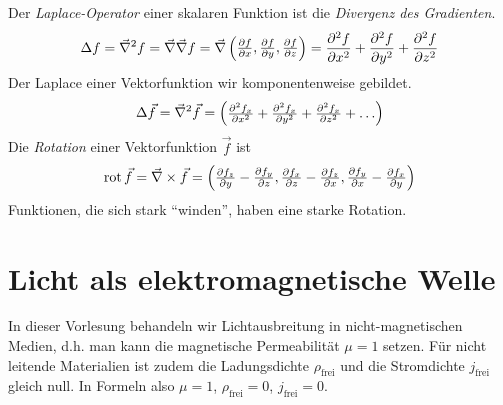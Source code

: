 Der \emph{Laplace-Operator}%
%
einer skalaren Funktion ist die \emph{Divergenz des Gradienten}.
\begin{gather*}
  \Delta f = \vecna^2 f= \vecna\vecna f = \vecna 
  \begin{pmatrix}
	\dif[f]{x},\dif[f]{y},\dif[f]{z}
  \end{pmatrix}
  = \diff[f]{x} + \diff[f]{y} + \diff[f]{z}
\end{gather*}
Der Laplace einer Vektorfunktion wir komponentenweise gebildet.
\begin{gather*}
  \Delta \vec{f} = \vecna^2 \vec{f}= 
  \begin{pmatrix}
    \diff[f_x]{x}+\diff[f_x]{y}+\diff[f_x]{z}+\dots
  \end{pmatrix}
\end{gather*}
Die \emph{Rotation} einer Vektorfunktion $\vec{f}$ ist
\begin{gather*}
  \Rot \vec{f}= \vecna\times \vec{f}=
  \begin{pmatrix}
    \dif[f_z]{y}-\dif[f_y]{z},\dif[f_x]{z}-\dif[f_z]{x},\dif[f_y]{x}-\dif[f_x]{y}
  \end{pmatrix}
\end{gather*}
Funktionen, die sich stark \enquote{winden}, haben eine starke Rotation.

\section{Licht als elektromagnetische Welle}
In dieser Vorlesung behandeln wir Lichtausbreitung in
nicht-magnetischen Medien, d.h. man kann die 
magnetische Permeabilität $\mu =1$%
setzen. Für nicht leitende Materialien ist zudem die
Ladungsdichte $\rho_\text{frei}$%
und die Stromdichte $j_\text{frei}$%
gleich
null. In Formeln also $\mu=1$, $\rho_\text{frei}=0$, $j_\text{frei}=0$.

